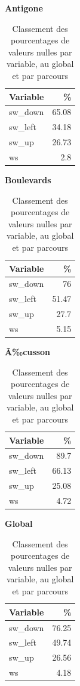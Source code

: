 \documentclass{article}
\begin{document}
\medskip

\begin{table}[H]

\begin{minipage}[t]{0.24\textwidth}
\centering
\textbf{Antigone}

\vspace{0.2cm}

\begin{tabular}{l r}
\toprule
Variable & \% \\
\midrule
sw\_down & 65.08 \\
sw\_left & 34.18 \\
sw\_up   & 26.73 \\
ws       & 2.8  \\
\bottomrule
\end{tabular}
\end{minipage}
\hfill
\begin{minipage}[t]{0.24\textwidth}
\centering
\textbf{Boulevards}

\vspace{0.2cm}

\begin{tabular}{l r}
\toprule
Variable & \% \\
\midrule
sw\_down & 76 \\
sw\_left & 51.47 \\
sw\_up   & 27.7 \\
ws       & 5.15  \\
\bottomrule
\end{tabular}
\end{minipage}
\hfill
\begin{minipage}[t]{0.24\textwidth}
\centering
\textbf{Ã‰cusson}

\vspace{0.2cm}

\begin{tabular}{l r}
\toprule
Variable & \% \\
\midrule
sw\_down & 89.7 \\
sw\_left & 66.13 \\
sw\_up   & 25.08 \\
ws       & 4.72  \\
\bottomrule
\end{tabular}
\end{minipage}
\hfill
\begin{minipage}[t]{0.24\textwidth}
\centering
\textbf{Global}

\vspace{0.2cm}

\begin{tabular}{l r}
\toprule
Variable & \% \\
\midrule
sw\_down & 76.25 \\
sw\_left & 49.74 \\
sw\_up   & 26.56 \\
ws       & 4.18  \\
\bottomrule
\end{tabular}
\end{minipage}
\centering
\caption{Classement des pourcentages de valeurs nulles par variable, au global et par parcours}
\label{tab:pct_zeros_parcours}
\end{table}
\end{document}

